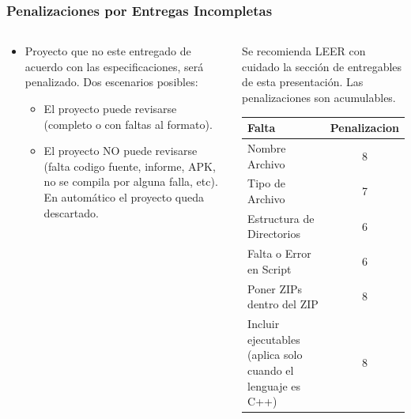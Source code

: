 \begin{frame}
\frametitle{Penalizaciones por Entregas Incompletas}
\begin{columns}
\begin{column}{0.4\textwidth}
\begin{itemize}
\item Proyecto que no este entregado de acuerdo con las especificaciones, ser\'a penalizado. Dos escenarios posibles:
\begin{itemize}
\item El proyecto puede revisarse (completo o con faltas al formato).
\item El proyecto NO puede revisarse (falta codigo fuente, informe, APK, no se compila por alguna falla, etc). En automático el proyecto queda descartado.
\end{itemize}
\end{itemize}
\end{column}
\begin{column}{0.6\textwidth}
Se recomienda LEER con cuidado la secci\'on de entregables de esta presentación. Las penalizaciones son acumulables. 
\begin{tabular}{p{5cm}|c}
\hline
\textbf{Falta} & \textbf{Penalizacion} \\
\hline
Nombre Archivo & 8 \\ \hline
Tipo de Archivo & 7 \\ \hline
Estructura de Directorios  & 6 \\ \hline
Falta o Error en Script  & 6 \\ \hline
Poner ZIPs dentro del ZIP  & 8 \\ \hline
Incluir ejecutables (aplica solo cuando el lenguaje es C++)  & 8 \\
\hline
\hline
\end{tabular}
\end{column}
\end{columns}
\end{frame}


